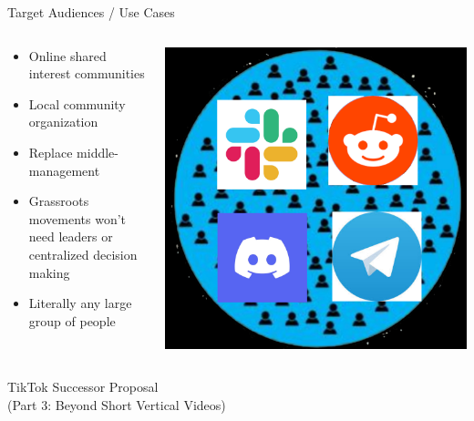 \documentclass[aspectratio=169]{beamer}
\begin{document}
\begin{frame}{Target Audiences / Use Cases}
\begin{columns}[T]
    \begin{column}[T]{0.5\textwidth}
        \begin{itemize}
            \item Online shared interest communities
            \item Local community organization
            \item Replace middle-management
            \item Grassroots movements won't need leaders or centralized decision making
            \item Literally any large group of people
        \end{itemize}
    \end{column}
    \begin{column}{0.5\textwidth}
        \includegraphics[height=0.8\textheight]{imgs/CSI_section/competition.png}
    \end{column}
\end{columns}
\end{frame}

\begin{frame}
    \centering
    \Huge TikTok Successor Proposal \\
    \Huge (Part 3: Beyond Short Vertical Videos)
\end{frame}
\end{document}
